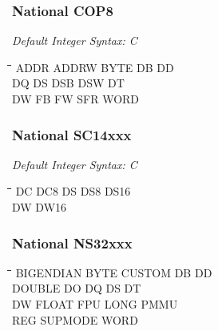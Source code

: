 \subsubsection{National COP8}

{\em Default Integer Syntax: C}

{\tt\begin{tabbing}
\hspace{3cm}\=\hspace{3cm}\=\hspace{3cm}\=\hspace{3cm}\=\kill
ADDR       \> ADDRW       \> BYTE        \> DB          \> DD \\
DQ         \> DS          \> DSB         \> DSW         \> DT \\
DW         \> FB          \> FW          \> SFR         \> WORD \\
\end{tabbing}}

\subsubsection{National SC14xxx}

{\em Default Integer Syntax: C}

{\tt\begin{tabbing}
\hspace{3cm}\=\hspace{3cm}\=\hspace{3cm}\=\hspace{3cm}\=\kill
DC         \> DC8         \> DS          \> DS8         \> DS16 \\
DW         \> DW16 \\
\end{tabbing}}

\subsubsection{National NS32xxx}
{\tt\begin{tabbing}
\hspace{3cm}\=\hspace{3cm}\=\hspace{3cm}\=\hspace{3cm}\=\kill
BIGENDIAN  \> BYTE        \> CUSTOM     \> DB           \> DD \\
DOUBLE     \> DO          \> DQ         \> DS           \> DT \\
DW         \> FLOAT       \> FPU        \> LONG         \> PMMU \\
REG        \> SUPMODE     \> WORD \\
\end{tabbing}}

